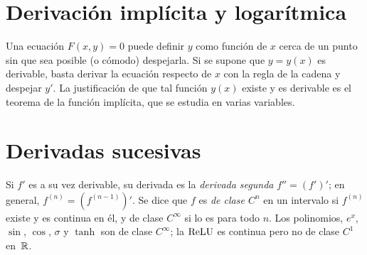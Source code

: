\section{Derivación implícita y logarítmica}

Una ecuación $F(x,y)=0$ puede definir $y$ como función de $x$ cerca de un punto sin que sea posible (o cómodo) despejarla. Si se supone que $y=y(x)$ es derivable, basta derivar la ecuación respecto de $x$ con la regla de la cadena y despejar $y'$. La justificación de que tal función $y(x)$ existe y es derivable es el teorema de la función implícita, que se estudia en varias variables.

\addtocounter{definicion}{1}%

\addtocounter{definicion}{1}%

\section{Derivadas sucesivas}

Si $f'$ es a su vez derivable, su derivada es la \emph{derivada segunda} $f''=(f')'$; en general, $f^{(n)}=(f^{(n-1)})'$. Se dice que $f$ es \emph{de clase $C^{n}$} en un intervalo si $f^{(n)}$ existe y es continua en él, y de clase $C^{\infty}$ si lo es para todo $n$. Los polinomios, $e^{x}$, $\sin$, $\cos$, $\sigma$ y $\tanh$ son de clase $C^{\infty}$; la $\operatorname{ReLU}$ es continua pero no de clase $C^{1}$ en~$\mathbb{R}$.

\addtocounter{definicion}{1}%

\addtocounter{definicion}{1}%

\addtocounter{definicion}{1}%

